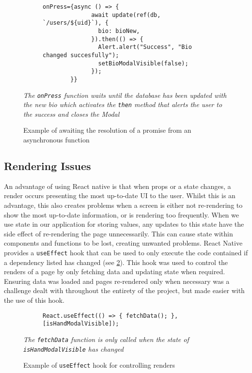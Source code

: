 \begin{figure}[!htbp]
    \centering
    \begin{subfigure}[b]{0.8\textwidth}
        \begin{lstlisting}[language=jsJsx]
        onPress={async () => {
              await update(ref(db, `/users/${uid}`), {
                bio: bioNew,
              }).then(() => {
                Alert.alert("Success", "Bio changed succesfully");
                setBioModalVisible(false);
              });
        }}
        \end{lstlisting}
    \end{subfigure}
\caption{Example of awaiting the resolution of a promise from an asynchronous function}
\small\textit{The \texttt{onPress} function waits until the database has been updated with the new bio which activates the \texttt{then} method that alerts the user to the success and closes the Modal}
\label{fig:asyncAwait}
\end{figure}
\FloatBarrier

\subsection*{Rendering Issues}
An advantage of using React native is that when props or a state changes, a render occurs presenting the most up-to-date UI to the user. Whilst this is an advantage, this also creates problems when a screen is either not re-rendering to show the most up-to-date information, or is rendering too frequently. When we use state in our application for storing values, any updates to this state have the side effect of re-rendering the page unnecessarily. This can cause state within components and functions to be lost, creating unwanted problems. React Native provides a \texttt{useEffect} hook that can be used to only execute the code contained if a dependency listed has changed (see \ref{fig:useEffect}). This hook was used to control the renders of a page by only fetching data and updating state when required. Ensuring data was loaded and pages re-rendered only when necessary was a challenge dealt with throughout the entirety of the project, but made easier with the use of this hook.
\begin{figure}[!htbp]
    \centering
    \begin{subfigure}[b]{0.8\textwidth}
        \begin{lstlisting}[language=jsJsx]
        React.useEffect(() => { fetchData(); }, [isHandModalVisible]);
        \end{lstlisting}
    \end{subfigure}
\caption{Example of \texttt{useEffect} hook for controlling renders}
\small\textit{The \texttt{fetchData} function is only called when the state of \texttt{isHandModalVisible} has changed}
\label{fig:useEffect}
\end{figure}
\FloatBarrier


